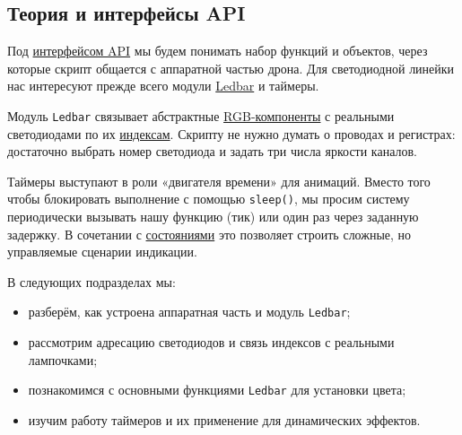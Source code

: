 \subsection{Теория и интерфейсы API}

Под \hyperlink{term:api}{интерфейсом API} мы будем понимать набор функций и объектов, через которые скрипт общается с аппаратной частью дрона. Для светодиодной линейки нас интересуют прежде всего модули \hyperlink{term:ledbar}{Ledbar} и таймеры.

Модуль \texttt{Ledbar} связывает абстрактные \hyperlink{term:rgb}{RGB-компоненты} с реальными светодиодами по их \hyperlink{term:index}{индексам}. Скрипту не нужно думать о проводах и регистрах: достаточно выбрать номер светодиода и задать три числа яркости каналов.

Таймеры выступают в роли «двигателя времени» для анимаций. Вместо того чтобы блокировать выполнение с помощью \texttt{sleep()}, мы просим систему периодически вызывать нашу функцию (тик) или один раз через заданную задержку. В сочетании с \hyperlink{term:state}{состояниями} это позволяет строить сложные, но управляемые сценарии индикации.

В следующих подразделах мы:
\begin{itemize}
    \item разберём, как устроена аппаратная часть и модуль \texttt{Ledbar};
    \item рассмотрим адресацию светодиодов и связь индексов с реальными лампочками;
    \item познакомимся с основными функциями \texttt{Ledbar} для установки цвета;
    \item изучим работу таймеров и их применение для динамических эффектов.
\end{itemize}
